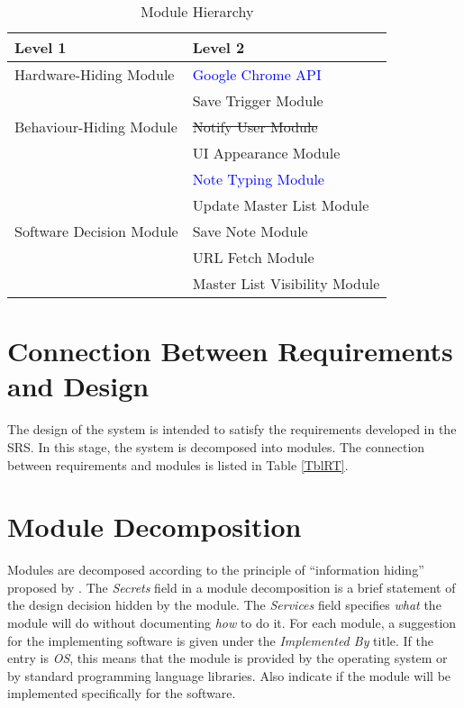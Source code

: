 \documentclass[12pt, titlepage]{article}
\begin{document}
\begin{table}[h!]
\centering
\begin{tabular}{p{} p{}}
\toprule
\textbf{Level 1} & \textbf{Level 2}\\
\midrule

{Hardware-Hiding Module} & \textcolor{blue}{Google Chrome API} \\
\midrule

\multirow{3}{0.3\textwidth}{Behaviour-Hiding Module} & Save Trigger Module\\
& \sout{Notify User Module}\\
& UI Appearance Module\\
& \textcolor{blue}{Note Typing Module}\\
\midrule

\multirow{3}{0.3\textwidth}{Software Decision Module} & {
	Update Master List Module}\\
& Save Note Module\\
& URL Fetch Module\\
& Master List Visibility Module\\
\bottomrule

\end{tabular}
\caption{Module Hierarchy}
\label{TblMH}
\end{table}

\section{Connection Between Requirements and Design} \label{SecConnection}

The design of the system is intended to satisfy the requirements developed in
the SRS. In this stage, the system is decomposed into modules. The connection
between requirements and modules is listed in Table \ref{TblRT}.

\section{Module Decomposition} \label{SecMD}

Modules are decomposed according to the principle of ``information hiding''
proposed by \citet{ParnasEtAl1984}. The \emph{Secrets} field in a module
decomposition is a brief statement of the design decision hidden by the
module. The \emph{Services} field specifies \emph{what} the module will do
without documenting \emph{how} to do it. For each module, a suggestion for the
implementing software is given under the \emph{Implemented By} title. If the
entry is \emph{OS}, this means that the module is provided by the operating
system or by standard programming language libraries.  Also indicate if the
module will be implemented specifically for the software.
\end{document}

